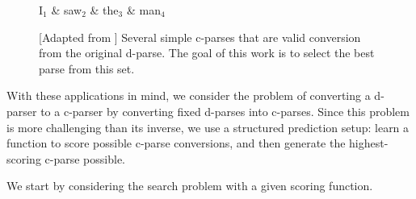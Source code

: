 \documentclass[11pt,letterpaper]{article}
\newcommand{\nascomment}[1]{\textcolor{blue}{\bf \small [#1 --nas]}}
\begin{document}
\begin{figure}
  \centering

  \vspace{-1cm}

  \begin{dependency}[theme=simple]
    \begin{deptext}[column sep=0.7cm]
      I$_1$ \& saw$_2$ \& the$_3$ \& man$_4$ \\
    \end{deptext}
  \end{dependency}

  \label{fig:inverse}
  \caption{{\footnotesize 
      [Adapted from \cite{collins1999statistical}] Several simple c-parses that  
      are valid conversion from the original d-parse. The goal of this work is to
      select the best parse from this set.
    }
    }
\end{figure}


With these applications in mind, we consider the problem of converting
a d-parser to a c-parser by converting fixed d-parses into c-parses.
Since this problem is more challenging than its inverse, we use a
structured prediction setup: learn a function to score possible
c-parse conversions, and then generate the highest-scoring c-parse possible.

We start by considering the search problem with a given scoring function. 


\end{document}
